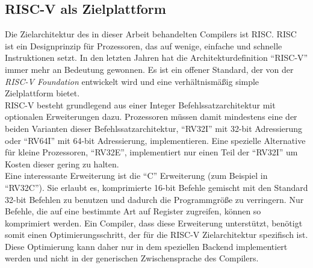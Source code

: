 \subsection{RISC-V als Zielplattform}

Die Zielarchitektur des in dieser Arbeit behandelten Compilers ist \ac{RISC}.
RISC ist ein Designprinzip für Prozessoren, das auf wenige, einfache und schnelle Instruktionen setzt.
In den letzten Jahren hat die Architekturdefinition ``RISC-V'' immer mehr an Bedeutung gewonnen.
Es ist ein offener Standard, der von der \textit{RISC-V Foundation} entwickelt wird und eine verhältnismäßig simple Zielplattform bietet\cite{RISCV}.\\

RISC-V besteht grundlegend aus einer Integer Befehlssatzarchitektur mit optionalen Erweiterungen dazu.
Prozessoren müssen damit mindestens eine der beiden Varianten dieser Befehlssatzarchitektur, ``RV32I'' mit 32-bit Adressierung oder ``RV64I'' mit 64-bit Adressierung, implementieren.
Eine spezielle Alternative für kleine Prozessoren, ``RV32E'', implementiert nur einen Teil der ``RV32I'' um Kosten dieser gering zu halten\cite{waterman:2017}.\\
Eine interessante Erweiterung ist die ``C'' Erweiterung (zum Beispiel in ``RV32C'').
Sie erlaubt es, komprimierte 16-bit Befehle gemischt mit den Standard 32-bit Befehlen zu benutzen und dadurch die Programmgröße zu verringern.
Nur Befehle, die auf eine bestimmte Art auf Register zugreifen, können so komprimiert werden.
Ein Compiler, dass diese Erweiterung unterstützt, benötigt somit einen Optimierungsschritt, der für die RISC-V Zielarchitektur spezifisch ist.
Diese Optimierung kann daher nur in dem speziellen Backend implementiert werden und nicht in der generischen Zwischensprache des Compilers.
